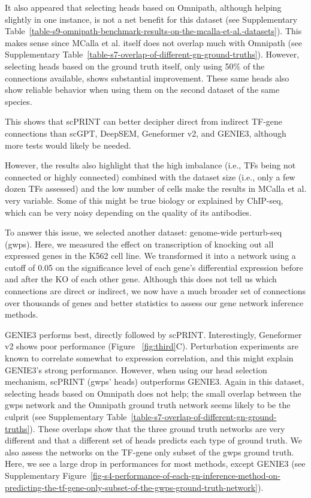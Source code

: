 It also appeared that selecting heads based on Omnipath, although helping slightly in one instance, is not a net benefit for this dataset (see Supplementary Table~\ref{table-s9-omnipath-benchmark-results-on-the-mcalla-et-al.-datasets}). This makes sense since MCalla et al. itself does not overlap much with Omnipath (see Supplementary Table~\ref{table-s7-overlap-of-different-gn-ground-truths}). However, selecting heads based on the ground truth itself, only using 50\% of the connections available, shows substantial improvement. These same heads also show reliable behavior when using them on the second dataset of the same species. 

This shows that \gls{scPRINT} can better decipher direct from indirect \gls{TF}-gene connections than \gls{scGPT}, Deep\gls{SEM}, Geneformer v2, and GENIE3, although more tests would likely be needed. 

However, the results also highlight that the high imbalance (i.e., \gls{TF}s being not connected or highly connected) combined with the dataset size (i.e., only a few dozen \gls{TF}s assessed) and the low number of cells make the results in MCalla et al. very variable. Some of this might be true biology or explained by \gls{ChIP-seq}, which can be very noisy depending on the quality of its antibodies\citep{kidderChIPSeqTechnicalConsiderations2011}.

To answer this issue, we selected another dataset: genome-wide perturb-seq (\gls{gwps})\citep{replogleMappingInformationrichGenotypephenotype2022}. Here, we measured the effect on transcription of knocking out all expressed genes in the K562 cell line. We transformed it into a network using a cutoff of 0.05 on the significance level of each gene's differential expression before and after the KO of each other gene. Although this does not tell us which connections are direct or indirect, we now have a much broader set of connections over thousands of genes and better statistics to assess our gene network inference methods.

GENIE3 performs best, directly followed by \gls{scPRINT}. Interestingly, Geneformer v2 shows poor performance (Figure ~\ref{fig:third}C). Perturbation experiments are known to correlate somewhat to expression correlation, and this might explain GENIE3's strong performance. However, when using our head selection mechanism, \gls{scPRINT} (gwps' heads) outperforms GENIE3. Again in this dataset, selecting heads based on Omnipath does not help; the small overlap between the \gls{gwps} network and the Omnipath ground truth network seems likely to be the culprit (see Supplementary Table~\ref{table-s7-overlap-of-different-gn-ground-truths}). These overlaps show that the three ground truth networks are very different and that a different set of heads predicts each type of ground truth. We also assess the networks on the \gls{TF}-gene only subset of the \gls{gwps} ground truth. Here, we see a large drop in performances for most methods, except GENIE3 (see Supplementary Figure~\ref{fig-s4-performance-of-each-gn-inference-method-on-predicting-the-tf-gene-only-subset-of-the-gwps-ground-truth-network}).

